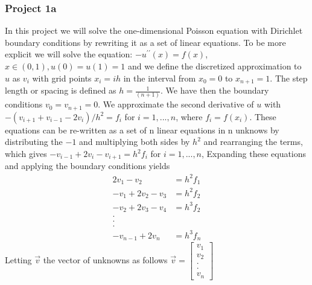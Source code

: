 \documentclass[11pt, oneside]{article}   	%
\begin{document}
\subsubsection{Project 1a}
In this project we will solve the one-dimensional Poisson equation with Dirichlet boundary conditions by rewriting it as a set of linear equations.
To be more explicit we will solve the equation:\newline
\newline
$-u^{\prime\prime} (x)=f(x)$, $x \in (0,1), u(0) = u(1) = 1$\newline
\newline
and we define the discretized approximation to $u$ as $v_i$ with grid points $x_i=ih$ in the interval from $x_0=0$ to $x_{n+1}=1$. The step length or spacing is defined as $h=\frac{1}{(n+1)}$. We have then the boundary conditions $v_0=v_{n+1}=0$. We approximate the second derivative of $u$ with\newline
\newline
$-(v_{i+1} + v_{i-1} - 2v_i)/{h^2} = f_i$ for $i = 1,...,n$,\newline
\newline
where $f_i=f(x_i)$.\newline
These equations can be re-written as a set of n linear equations in n unknows by distributing the $-1$ and multiplying both sides by $h^2$ and rearranging the terms, which gives\newline
\newline
$-v_{i-1} + 2v_i  - v_{i+1}=h^2 f_i$ for $i = 1,...,n$,\newline
\newline
Expanding these equations and applying the boundary conditions yields\newline
\newline
\begin{align*}
2v_1 - v_2 &= h^2 f_1 \\
-v_1 + 2v_2 - v_3 &= h^2f_2\\
-v_2 + 2v_3 - v_4 &= h^3f_2\\.\\.\\.\\
-v_{n-1} + 2v_n &= h^3f_n
\end{align*}\newline
\newline
Letting $\vec{v}$ the vector of unknowns as follows\newline
\newline
$\vec{v}=  \begin{bmatrix}
v_1\\
v_2\\
.\\
.\\
v_n
\end{bmatrix}$\newline
\end{document}
